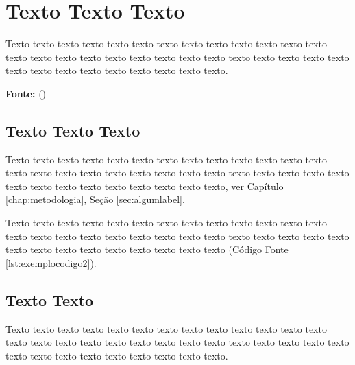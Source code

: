 \chapter{Texto Texto Texto}
\label{chap:capitulo1}

Texto texto texto texto texto texto texto texto texto texto texto texto texto texto texto texto texto texto texto texto texto texto texto texto texto texto texto texto texto texto texto texto texto texto texto texto.



\hfill
\begin{minipage}[t]{.65\textwidth}
\ABNTEXfontereduzida\selectfont\textbf{Fonte:} \citeauthor{universidadejava2020}  (\citeyear{universidadejava2020}) 
\end{minipage}




\section{Texto Texto Texto}
\label{sec:label}
Texto texto texto texto texto texto texto texto texto texto texto texto texto texto texto texto texto texto texto texto texto texto texto texto texto texto texto texto texto texto texto texto texto texto texto texto, ver Capítulo \ref{chap:metodologia}, Seção \ref{sec:algumlabel}.

Texto texto texto texto texto texto texto texto texto texto texto texto texto texto texto texto texto texto texto texto texto texto texto texto texto texto texto texto texto texto texto texto texto texto texto texto (Código Fonte \ref{lst:exemplocodigo2}).


\section{Texto Texto}
\label{sec:outralabel}

Texto texto texto texto texto texto texto texto texto texto texto texto texto texto texto texto texto texto texto texto texto texto texto texto texto texto texto texto texto texto texto texto texto texto texto texto.

